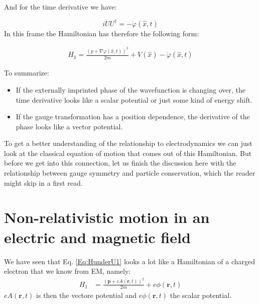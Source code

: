 \documentclass[10pt]{article}
\newcommand{\ch}{e}
\begin{document}
And for the time derivative we have:

\begin{equation}
i \dot{U}U^\dag = -\dot{\varphi}(\hat{x},t)
\end{equation}
In this frame the Hamiltonian has therefore the following form:

\begin{align}\label{Eq:HunderU1}
H_1 = \frac{\left(p+\nabla \varphi(\hat{x},t)\right)^2}{2m}+V(\hat{x})-\dot{\varphi}(\hat{x},t)
\end{align}

To summarize:
\begin{itemize}
\item If the externally imprinted phase of the wavefunction is changing over, the time derivative looks like a scalar potential or just some kind of energy shift.
\item If the gauge transformation has a position dependence, the derivative of the phase looks like a vector potential. 
\end{itemize}
To get a better understanding of the relationship to electrodynamics we can just look at the classical equation of motion that comes out of this Hamiltonian. But before we get into this connection, let us finish the discussion here with the relationship between gauge symmetry and particle conservation, which the reader might skip in a first read.

\section{Non-relativistic motion in an electric and magnetic field}\label{Sec:NR_EM}
We have seen that Eq. \eqref{Eq:HunderU1} looks a lot like a Hamiltonian of a charged electron that we know from EM, namely:
\begin{eqnarray}
H_1 &= \frac{(\mathbf{p}+\ch A(\mathbf{r},t))^2}{2m}+\ch\phi(\mathbf{r},t)
\end{eqnarray}
$\ch A(\mathbf{r},t)$ is then the vectore potential and $\ch\phi(\mathbf{r},t)$ the scalar potential.
\end{document}
